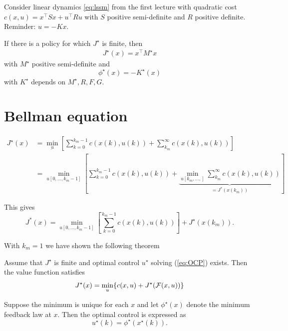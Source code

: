 \begin{example}
    Consider linear dynamics \ref{eq:lssm} %
     from the first lecture with 
    quadratic cost \(c(x,u)=x^\intercal Sx+u^\intercal Ru\) with \(S\) positive semi-definite and 
    \(R\) positive definite.
    Reminder: \(u=-Kx\).

    If there is a policy for which \(J^\star\) is finite, then 
    \begin{align*}
        J^\star(x)=x^\intercal M^\star x
    \end{align*}
    with \(M^\star\) positive semi-definite and 
    \[\phi^\star(x)=-K^\star(x)\]
    with \(K^\star\) depends on \(M^\star,R,F,G\). 
\end{example}

\section*{Bellman equation}


\begin{align*}
    J^\star(x)&=\min_{\underbar{u}}\left[\sum_{k=0}^{k_m-1}c(x(k),u(k))+\sum_{k_m}^\infty c(x(k),u(k))\right]\\
    &=\min_{u[0,\dots,k_m-1]}\left[\sum_{k=0}^{k_m-1}c(x(k),u(k))+\underbrace{\min_{u[k_m,\dots,]}\sum_{k_m}^\infty c(x(k),u(k))}_{=J^*(x(k_m))}\right]
\end{align*}

This gives 
\[J^*(x)=\min_{u[0,\dots,k_m-1]}\left[\sum_{k=0}^{k_m-1}c(x(k),u(k))\right]+J^\star(x(k_m)).\]

With \(k_m=1\) we have shown the following theorem 
\begin{theorem}\label{thm:1.13}
    Assume that \(J^\star\) is finite and optimal control \(u^\star\) solving (\ref{eq:OCP}) exists.
    Then the value function satisfies 
    \begin{equation}\label{eq:bellman}
        J^\star(x)=\min_{u}\{c(x,u)+J^\star(\mathcal{F}(x,u))\}
    \end{equation}
\end{theorem}

Suppose the minimum is unique for each \(x\) and let \(\phi^\star(x)\) denote 
the minimum feedback law at \(x\). Then the optimal control is expressed as 
\[u^\star(k)=\phi^\star(x^\star(k)).\]

